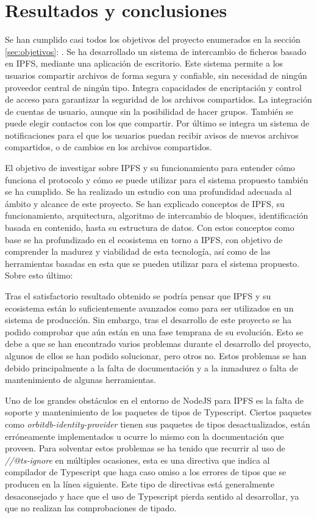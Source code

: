 \chapter{Resultados y conclusiones}\label{chap:6resultados}

Se han cumplido casi todos los objetivos del proyecto enumerados en la sección \ref{sec:objetivos}: . Se ha desarrollado un sistema de intercambio de ficheros basado en IPFS, mediante una aplicación de escritorio. Este sistema permite a los usuarios compartir archivos de forma segura y confiable, sin necesidad de ningún proveedor central de ningún tipo. Integra capacidades de encriptación y control de acceso para garantizar la seguridad de los archivos compartidos. La integración de cuentas de usuario, aunque sin la posibilidad de hacer grupos. También se puede elegir contactos con los que compartir. Por último se integra un sistema de notificaciones para el que
los usuarios puedan recibir avisos de nuevos archivos compartidos, o de cambios en los archivos compartidos.

El objetivo de investigar sobre IPFS y su funcionamiento para entender cómo funciona el protocolo y cómo se puede utilizar para el sistema propuesto también se ha cumplido. Se ha realizado un estudio con una profundidad adecuada al ámbito y alcance de este proyecto. Se han explicado conceptos de IPFS, su funcionamiento, arquitectura, algoritmo de intercambio de bloques, identificación basada en contenido, hasta su estructura de datos.
Con estos conceptos como base se ha profundizado en el ecosistema en torno a IPFS, con objetivo de comprender la madurez y viabilidad de esta tecnología, así como de las herramientas basadas en esta que se pueden utilizar para el sistema propuesto. Sobre esto último:

Tras el satisfactorio resultado obtenido se podría pensar que IPFS y su ecosistema están lo suficientemente avanzados como para ser utilizados en un sistema de producción. Sin embargo, tras el desarrollo de este proyecto se ha podido comprobar que aún están en una fase temprana de su evolución. Esto se debe a que se han encontrado varios problemas durante el desarrollo del proyecto, algunos de ellos se han podido solucionar, pero otros no. Estos problemas se han debido principalmente a la falta de documentación y a la inmadurez o falta de mantenimiento de algunas herramientas.

Uno de los grandes obstáculos en el entorno de NodeJS para IPFS es la falta de soporte y mantenimiento de los paquetes de tipos de Typescript.
Ciertos paquetes como \textit{orbitdb-identity-provider} tienen sus paquetes de tipos desactualizados, están erróneamente implementados u ocurre lo mismo con
la documentación que proveen. Para solventar estos problemas se ha tenido que recurrir al uso de \textit{//@ts-ignore} en múltiples ocasiones, esta
es una directiva que indica al compilador de Typescript que haga caso omiso a los errores de tipos que se producen en la línea siguiente. Este tipo de directivas está
generalmente desaconsejado y hace que el uso de Typescript pierda sentido al desarrollar, ya que no realizan las comprobaciones de tipado.

